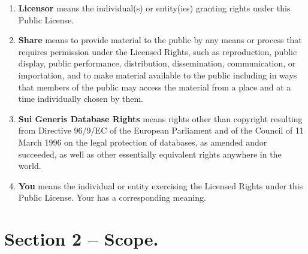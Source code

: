 \begin{enumerate}[label=\alph*.]
  \item \textbf{Licensor} means the individual(s) or entity(ies) granting rights under this Public License.

  \item \textbf{Share} means to provide material to the public by any means or process that requires permission under the Licensed Rights, such as reproduction, public display, public performance, distribution, dissemination, communication, or importation, and to make material available to the public including in ways that members of the public may access the material from a place and at a time individually chosen by them.

  \item \textbf{Sui Generis Database Rights} means rights other than copyright resulting from Directive 96/9/EC of the European Parliament and of the Council of 11 March 1996 on the legal protection of databases, as amended and\myslash or succeeded, as well as other essentially equivalent rights anywhere in the world.

  \item \textbf{You} means the individual or entity exercising the Licensed Rights under this Public License. Your has a corresponding meaning.
\end{enumerate}

\section{Section 2 – Scope.}
\label{section2}

